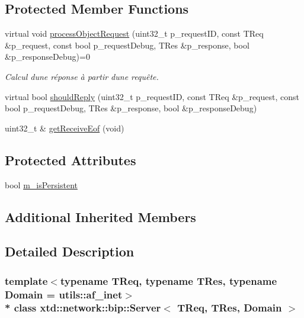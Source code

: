 \subsection*{Protected Member Functions}
\begin{DoxyCompactItemize}
\item 
virtual void \hyperlink{classxtd_1_1network_1_1bip_1_1Server_ab50170b42e25b207fb0af9f4d47a3430}{process\+Object\+Request} (uint32\+\_\+t p\+\_\+request\+ID, const T\+Req \&p\+\_\+request, const bool p\+\_\+request\+Debug, T\+Res \&p\+\_\+response, bool \&p\+\_\+response\+Debug)=0
\begin{DoxyCompactList}\small\item\em Calcul d\textquotesingle{}une réponse à partir d\textquotesingle{}une requête. \end{DoxyCompactList}\item 
virtual bool \hyperlink{classxtd_1_1network_1_1bip_1_1Server_a81b22d0e5ce1b5f8f6cfbe8618f09cad}{should\+Reply} (uint32\+\_\+t p\+\_\+request\+ID, const T\+Req \&p\+\_\+request, const bool p\+\_\+request\+Debug, T\+Res \&p\+\_\+response, bool \&p\+\_\+response\+Debug)
\item 
uint32\+\_\+t \& \hyperlink{classxtd_1_1network_1_1bip_1_1Server_aaeacc82ce89563b36e863ba4bbab2470}{get\+Receive\+Eof} (void)
\end{DoxyCompactItemize}
\subsection*{Protected Attributes}
\begin{DoxyCompactItemize}
\item 
bool \hyperlink{classxtd_1_1network_1_1bip_1_1Server_ae9efbc2f358222636d3134bf8973f906}{m\+\_\+is\+Persistent}
\end{DoxyCompactItemize}
\subsection*{Additional Inherited Members}


\subsection{Detailed Description}
\subsubsection*{template$<$typename T\+Req, typename T\+Res, typename Domain = utils\+::af\+\_\+inet$>$\\*
class xtd\+::network\+::bip\+::\+Server$<$ T\+Req, T\+Res, Domain $>$}


